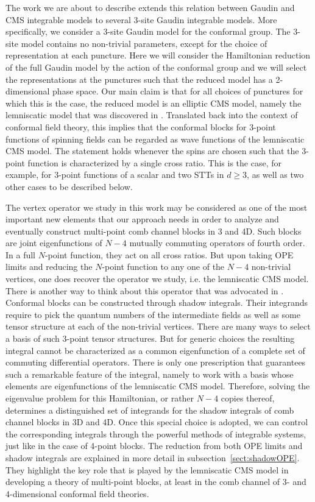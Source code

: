 \documentclass{article}
\begin{document}
The work we are about to describe extends this relation between Gaudin and 
CMS integrable models to several $3$-site Gaudin integrable models. 
More specifically, we consider a 3-site Gaudin model for the conformal group. The 
$3$-site model contains no non-trivial parameters, except for the choice of 
representation at each puncture. Here we will consider the Hamiltonian reduction of 
the full Gaudin model by the action of the conformal group and we will select the 
representations at the  
punctures such that the reduced model has a 2-dimensional phase space. Our main 
claim is that for all choices of punctures for which this is the case, the reduced 
model is an elliptic CMS model, namely the lemniscatic model that 
was discovered in \cite{etingof2011107}. Translated back into the context of 
conformal field theory, this implies that the conformal blocks for 3-point functions 
of spinning fields can be regarded as wave functions of the lemniscatic 
CMS model. The statement holds whenever the spins are chosen such 
that the 3-point function is characterized by a single cross ratio. This is the 
case, for example, for 3-point functions of a scalar and two STTs in $d \geq 3$, 
as well as two other cases to be described below.

The vertex operator we study in this work may be considered as one of the most important 
new elements that our approach needs in order to analyze and eventually construct 
multi-point comb channel blocks in 3 and 4D. Such blocks are joint eigenfunctions of 
$N-4$ mutually commuting operators of fourth order. In a full $N$-point function, 
they act on all cross ratios. But upon taking OPE limits and reducing the $N$-point 
function to any one of the $N-4$ non-trivial vertices, one does recover the operator 
we study, i.e. the lemniscatic CMS model. There is another way to 
think about this operator that was advocated in \cite{Buric:2020dyz}. Conformal 
blocks can be constructed through shadow integrals. Their integrands require to 
pick the quantum numbers of the intermediate fields as well as some tensor 
structure at each of the non-trivial vertices. There are many ways to select a 
basis of such 3-point tensor structures. But for generic choices the resulting
integral cannot be characterized as a common eigenfunction of a complete set of 
commuting differential operators. There is only one prescription that guarantees 
such a remarkable feature of the integral, namely to work with a basis whose
elements are eigenfunctions of the lemniscatic CMS model. Therefore, solving the 
eigenvalue problem for this Hamiltonian, or rather $N-4$ copies thereof, 
determines a distinguished set of integrands for the shadow integrals of comb 
channel blocks in 3D and 4D. Once this special choice is adopted, 
we can control the corresponding integrals through the 
powerful methods of integrable systems, just like in the case of 4-point 
blocks. The reduction from both OPE limits and shadow integrals are explained in more detail 
in subsection~\ref{sect:shadowOPE}. They highlight the key role that is played 
by the lemniscatic CMS model in developing a theory of multi-point blocks, 
at least in the comb channel of 3- and 4-dimensional conformal field 
theories. 
\medskip 
\end{document}
